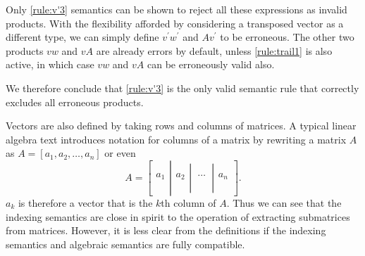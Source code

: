 Only \ref{rule:v'3} semantics can be shown to reject all these expressions as
invalid products. With the flexibility afforded by considering a transposed
vector as a different type, we can simply define $v^\prime w^\prime$ and
$Av^\prime$ to be erroneous. The other two products $vw$ and $vA$ are already
errors by default, unless \ref{rule:trail1} is also active, in which case $vw$
and $vA$ can be erroneously valid also.

We therefore conclude that \ref{rule:v'3} is the only valid semantic rule that
correctly excludes all erroneous products.



Vectors are also defined
by taking rows and columns of matrices. A typical linear algebra text
introduces notation for columns of a matrix by rewriting a matrix $A$ as
$A = [a_1, a_2, \dots, a_n]$ or even~\cite[for example,
p. 6]{Trefethen1997}
\[
A = \left[\left.\begin{array}{c}
\\
\\
a_1\\
\\
\\
\end{array}\right|\begin{array}{c}
\\
\\
a_2\\
\\
\\
\end{array}\left|\begin{array}{c}
\\
\\
\ \cdots\ \\
\\
\\
\end{array}\right|\begin{array}{c}
\\
\\
a_n\\
\\
\\
\end{array}\right].\label{eq:cols}
\]
%
$a_k$ is therefore a vector that is the $k$th column of $A$.  Thus we can see that
the indexing semantics are close in spirit to the operation of extracting
submatrices from matrices. However, it is less clear from the definitions if
the indexing semantics and algebraic semantics are fully compatible.



